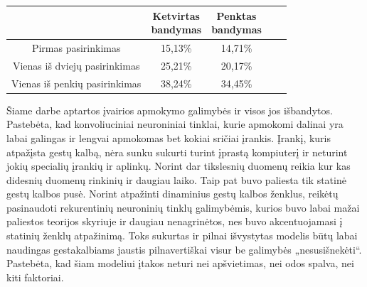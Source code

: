 \documentclass{VUMIFInfKursinis}
\begin{document}
\vspace{\baselineskip}
\begin{minipage}{\linewidth}
	\centering
	\label{tab:title2} 
	\begin{tabular}{ |c|c|c|c|c| } 
		\hline
		& \thead{Ketvirtas\\bandymas} & \thead{Penktas\\bandymas} \\
		\hline
		Pirmas pasirinkimas & 15,13\% & 14,71\% \\
		Vienas iš dviejų pasirinkimas & 25,21\% & 20,17\% \\
		Vienas iš penkių pasirinkimas & 38,24\% & 34,45\% \\
		\hline
	\end{tabular}
\end{minipage}

Šiame darbe aptartos įvairios apmokymo galimybės ir visos jos išbandytos. Pastebėta, kad konvoliuciniai neuroniniai tinklai, kurie apmokomi dalinai yra labai galingas ir lengvai apmokomas bet kokiai sričiai įrankis. Įrankį, kuris atpažįsta gestų kalbą, nėra sunku sukurti turint įprastą kompiuterį ir neturint jokių specialių įrankių ir aplinkų. Norint dar tikslesnių duomenų reikia kur kas didesnių duomenų rinkinių ir daugiau laiko. Taip pat buvo paliesta tik statinė gestų kalbos pusė. Norint atpažinti dinaminius gestų kalbos ženklus, reikėtų pasinaudoti rekurentinių neuroninių tinklų galimybėmis, kurios buvo labai mažai paliestos teorijos skyriuje ir daugiau nenagrinėtos, nes buvo akcentuojamasi į statinių ženklų atpažinimą. Toks sukurtas ir pilnai išvystytas modelis būtų labai naudingas gestakalbiams jaustis pilnavertiškai visur be galimybės „nesusišnekėti“. Pastebėta, kad šiam modeliui įtakos neturi nei apšvietimas, nei odos spalva, nei kiti faktoriai. 

\printbibliography[heading=bibintoc] %

\appendix  %
\end{document}
